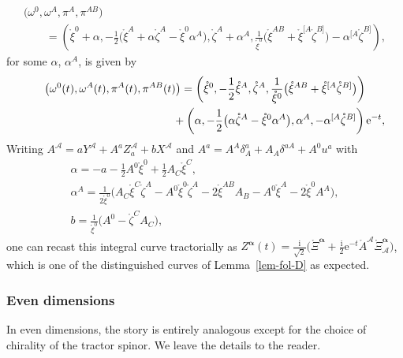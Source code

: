 \documentclass[10pt,a4paper]{amsart}
\numberwithin{equation}{section}
\newcommand{\mc} [1]{\mathcal{#1}}
\newcommand{\ii} {\mathrm{i}}
\newcommand{\ee} {\mathrm{e}}
\newcommand{\mr}[1] {\mathring{#1}}
\begin{document}
\begin{gather*}
\big( \omega^0 , \omega^A , \pi^A , \pi^{AB} \big)\\
\qquad{} = \left( \mr{\xi}^0 + \alpha ,
- \frac{1}{2} \big( \mr{\xi}^A + \alpha \mr{\zeta}^A - \mr{\xi}^0 \alpha^A \big) ,
\mr{\zeta}^A + \alpha^A , \frac{1}{\mr{\xi}^0} \big( \mr{\xi}^{AB} + \mr{\xi}^{[A} \mr{\zeta}^{B]} \big) - \alpha^{[A} \mr{\zeta}^{B]} \right) ,
\end{gather*}
for some $\alpha$, $\alpha^A$, is given by
\begin{gather*}
\big( \omega^0 (t), \omega^A (t), \pi^A (t), \pi^{AB} (t)\big) = \left( \mr{\xi}^0 ,- \frac{1}{2} \mr{\xi}^A ,
\mr{\zeta}^A , \frac{1}{\mr{\xi}^0} \big( \mr{\xi}^{AB} + \mr{\xi}^{[A} \mr{\zeta}^{B]} \big) \right) \\
\hphantom{\big( \omega^0 (t), \omega^A (t), \pi^A (t), \pi^{AB} (t)\big) =}{}
+ \left( \alpha ,- \frac{1}{2} \big( \alpha \mr{\zeta}^A - \mr{\xi}^0 \alpha^A \big) ,
 \alpha^A , - \alpha^{[A} \mr{\zeta}^{B]} \right) \ee^{-t} ,
\end{gather*}
Writing $A^\mc{A} = a Y^\mc{A} + A^a Z_a^\mc{A} + b X^\mc{A}$ and $A^a = A^A \delta_A^a + A_A \delta^{aA} + A^0 u^a$ with
\begin{gather*}
\alpha = -a - \frac{1}{2}A^0 \mr{\xi}^0 + \frac{1}{2} A_C \mr{\xi}^C , \\
\alpha^A = \frac{1}{2 \mr{\xi}^0} \big( A_C \mr{\xi}^C \mr{\zeta}^A - A^0 \mr{\xi}^0 \mr{\zeta}^A - 2 \mr{\xi}^{AB} A_B - A^0 \mr{\xi}^A - 2 \mr{\xi}^0 A^A \big) , \\
b = \frac{1}{\mr{\xi}^0} \big(A^0 - \mr{\zeta}^C A_C \big) ,
\end{gather*}
one can recast this integral curve tractorially as $Z^{\bm{\upalpha}} (t) = \frac{\ii}{\sqrt{2}} \big( \mr{\Xi}^{\bm{\upalpha}} + \frac{\ii}{2} \ee^{-t} \mr{A}^{\mc{A}} \mr{\Xi}^{\bm{\upalpha}}_{\mc{A}} \big)$, which is one of the distinguished curves of Lemma~\ref{lem-fol-D} as expected.

\subsubsection{Even dimensions}
In even dimensions, the story is entirely analogous except for the choice of chirality of the tractor spinor. We leave the details to the reader.
\end{document}
